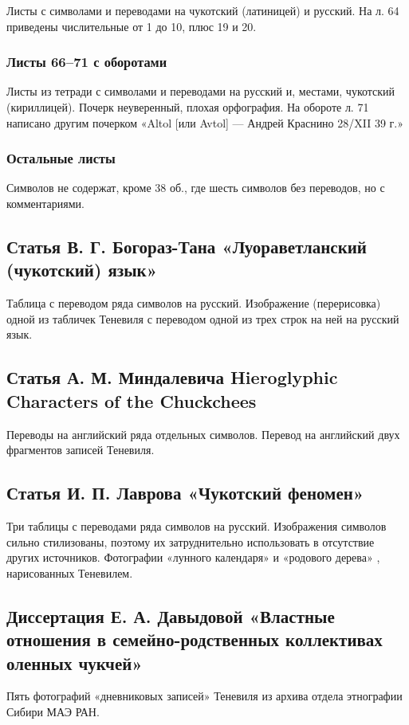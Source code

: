 \documentclass{article}
\newcounter{glyph}
\begin{document}
Листы с символами и переводами на чукотский (латиницей) и русский. На л. 64 приведены числительные от 1 до 10, плюс 19 и 20.

\subsubsection{Листы 66–71 с оборотами}

Листы из тетради с символами и переводами на русский и, местами, чукотский (кириллицей). Почерк неуверенный, плохая орфография. На обороте л. 71 написано другим почерком «Altol [или Avtol] — Андрей Краснино 28/XII 39 г.»

\subsubsection{Остальные листы}

Символов не содержат, кроме 38 об., где шесть символов без переводов, но с комментариями.

\subsection{Статья В. Г. Богораз-Тана «Луораветланский (чукотский) язык»}

Таблица с переводом ряда символов на русский. Изображение (перерисовка) одной из табличек Теневиля с переводом одной из трех строк на ней на русский язык.

\subsection{Статья А. М. Миндалевича Hieroglyphic Characters of the Chuckchees}

Переводы на английский ряда отдельных символов. Перевод на английский двух фрагментов записей Теневиля.

\subsection{Статья И. П. Лаврова «Чукотский феномен»}

Три таблицы с переводами ряда символов на русский. Изображения символов сильно стилизованы, поэтому их затруднительно использовать в отсутствие других источников. Фотографии «лунного календаря» и «родового дерева» , нарисованных Теневилем.

\subsection{Диссертация Е. А. Давыдовой «Властные отношения в семейно-родственных коллективах оленных чукчей»}

Пять фотографий «дневниковых записей» Теневиля из архива отдела этнографии Сибири МАЭ РАН.

\printbibliography
\end{document}
